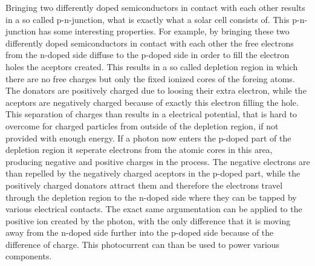 Bringing two differently doped semiconductors in contact with each other results in a so called p-n-junction, what is exactly what a solar cell consists of. This p-n-junction has some interesting properties. For example, by bringing these two differently doped semiconductors in contact with each other the free electrons from the n-doped side diffuse to the p-doped side in order to fill the electron holes the aceptors created. This results in a so called depletion region in which there are no free charges but only the fixed ionized cores of the foreing atoms. The donators are positively charged due to loosing their extra electron, while the aceptors are negatively charged because of exactly this electron filling the hole. This separation of charges than results in a electrical potential, that is hard to overcome for charged particles from outside of the depletion region, if not provided with enough energy. \newline
If a photon now enters the p-doped part of the depletion region it seperate electrons from the atomic cores in this area, producing negative and positive charges in the process. The negative electrons are than repelled by the negatively charged aceptors in the p-doped part, while the positively charged donators attract them and therefore the electrons travel through the depletion region to the n-doped side where they can be tapped by various electrical contacts. The exact same argumentation can be applied to the positive ion created by the photon, with the only difference that it is moving away from the n-doped side further into the p-doped side because of the difference of charge. 
This photocurrent can than be used to power various components.

